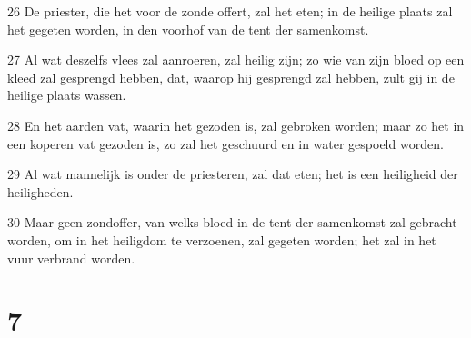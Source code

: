 \par 26 De priester, die het voor de zonde offert, zal het eten; in de heilige plaats zal het gegeten worden, in den voorhof van de tent der samenkomst.
\par 27 Al wat deszelfs vlees zal aanroeren, zal heilig zijn; zo wie van zijn bloed op een kleed zal gesprengd hebben, dat, waarop hij gesprengd zal hebben, zult gij in de heilige plaats wassen.
\par 28 En het aarden vat, waarin het gezoden is, zal gebroken worden; maar zo het in een koperen vat gezoden is, zo zal het geschuurd en in water gespoeld worden.
\par 29 Al wat mannelijk is onder de priesteren, zal dat eten; het is een heiligheid der heiligheden.
\par 30 Maar geen zondoffer, van welks bloed in de tent der samenkomst zal gebracht worden, om in het heiligdom te verzoenen, zal gegeten worden; het zal in het vuur verbrand worden.

\chapter{7}

